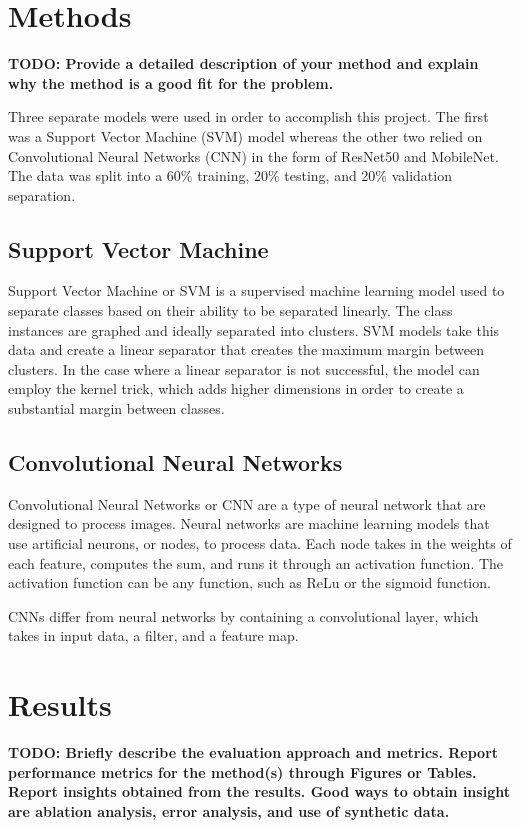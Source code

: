 \documentclass{article}
\theoremstyle{plain}
\theoremstyle{definition}
\theoremstyle{remark}
\begin{document}
\section{Methods}
\textbf{TODO: Provide a detailed description of your method and explain why the method is a good fit for
the problem.}

Three separate models were used in order to accomplish this project. The first was a Support Vector
Machine (SVM) model whereas the other two relied on Convolutional Neural Networks (CNN) in the form
of ResNet50 and MobileNet. The data was split into a 60\% training, 20\% testing, and 20\% validation
separation.

\subsection{Support Vector Machine}
Support Vector Machine or SVM is a supervised machine learning model used to separate classes based
on their ability to be separated linearly. The class instances are graphed and ideally separated
into clusters. SVM models take this data and create a linear separator that creates the maximum
margin between clusters. In the case where a linear separator is not successful, the model can employ
the kernel trick, which adds higher dimensions in order to create a substantial margin between classes.

\subsection{Convolutional Neural Networks}
Convolutional Neural Networks or CNN are a type of neural network that are designed to process images.
Neural networks are machine learning models that use artificial neurons, or nodes, to process data.
Each node takes in the weights of each feature, computes the sum, and runs it through an activation
function. The activation function can be any function, such as ReLu or the sigmoid function. 

CNNs differ from neural networks by containing a convolutional layer, which takes in input data,
a filter, and a feature map.

\section{Results}
\textbf{TODO: Briefly describe the evaluation approach and metrics. Report performance metrics for the method(s) through Figures or Tables.
Report insights obtained from the results. Good ways to obtain insight are ablation analysis, error
analysis, and use of synthetic data.}
\end{document}
